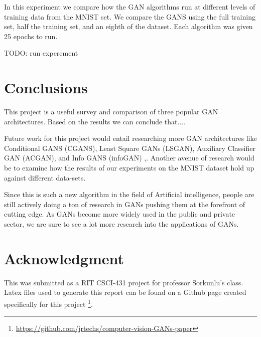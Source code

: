 \documentclass[12pt,
 reprint,
nofootinbib,
 amsmath,amssymb,
 aps,
floatfix,
]{revtex4-2}
\begin{document}
In this experiment we compare how the GAN algorithms run at different levels of training data from the MNIST set. We compare the GANS using the full training set, half the training set, and an eighth of the dataset. Each algorithm was given 25 epochs to run. 

TODO: run experement






\section{\label{sec:exp}Conclusions}

This project is a useful survey and comparison of three popular GAN architectures. Based on the results we can conclude that....

Future work for this project would entail researching more GAN architectures like Conditional GANS (CGANS), Least Square GANs (LSGAN), Auxiliary Classifier GAN (ACGAN), and Info GANS (infoGAN) \cite{cGAN, lsgan, acgan, infogan},. Another avenue of research would be to examine how the results of our experiments on the MNIST dataset hold up against different data-sets. 

Since this is such a new algorithm in the field of Artificial intelligence, people are still actively doing a ton of research in GANs pushing them at the forefront of cutting edge. As GANs become more widely used in the public and private sector, we are sure to see a lot more research into the applications of GANs.

\section{Acknowledgment}

This was submitted as a RIT CSCI-431 project for professor Sorkunlu's class. Latex files used to generate this report can be found on a Github page created specifically for this project \footnote{\url{https://github.com/jrtechs/computer-vision-GANs-paper}}. 





\end{document}
